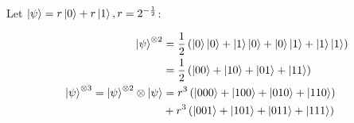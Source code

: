 \documentclass[all.tex]{subfiles}
\begin{document}
\ignorespaces
\parindent 0pt

\par Let $\ket{\psi} = r \ket{0} + r \ket{1}, r = 2^{-\frac{1}{2}}$:

\begin{align}
\ket{\psi}^{\otimes 2} &= \frac{1}{2} \left( \ket{0} \ket{0} + \ket{1} \ket{0} +
\ket{0} \ket{1} + \ket{1} \ket{1} \right) \\
&= \frac{1}{2} \left( \ket{00} + \ket{10} + \ket{01} + \ket{11} \right) \\
\ket{\psi}^{\otimes 3} = \ket{\psi}^{\otimes 2} \otimes \ket{\psi} &= r^3 \left(
\ket{000} + \ket{100} + \ket{010} + \ket{110} \right) \\
&+ r^3 \left( \ket{001} + \ket{101} + \ket{011} + \ket{111} \right)
\end{align}
\end{document}
